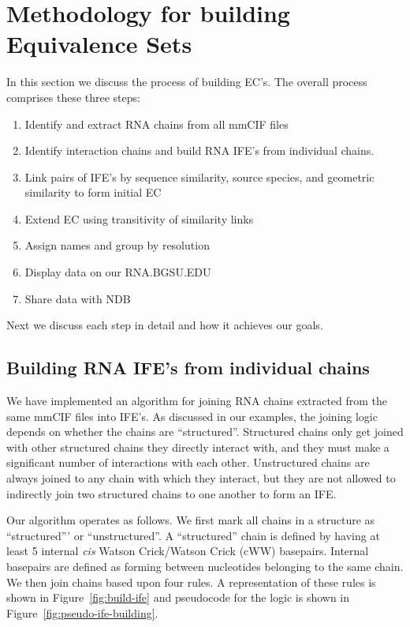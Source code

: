 \section{Methodology for building Equivalence Sets}

In this section we discuss the process of building EC's. The overall process
comprises these three steps:

\begin{enumerate}
  \item Identify and extract RNA chains from all mmCIF files

  \item Identify interaction chains and build RNA IFE's from individual chains.

  \item Link pairs of IFE's by sequence similarity, source species, and
    geometric similarity to form initial EC

  \item Extend EC using transitivity of similarity links

  \item Assign names and group by resolution

  \item Display data on our RNA.BGSU.EDU

  \item Share data with NDB
\end{enumerate}

Next we discuss each step in detail and how it achieves our goals.

\subsection{Building RNA IFE's from individual chains}

We have implemented an algorithm for joining RNA chains extracted from the same
mmCIF files into IFE's. As discussed in our examples, the joining logic depends
on whether the chains are ``structured''. Structured chains only get joined with
other structured chains they directly interact with, and they must make a
significant number of interactions with each other. Unstructured chains are
always joined to any chain with which they interact, but they are not allowed to
indirectly join two structured chains to one another to form an IFE.

Our algorithm operates as follows. We first mark all chains in a structure as
``structured''' or ``unstructured''. A ``structured'' chain is defined by having
at least 5 internal \emph{cis} Watson Crick/Watson Crick (cWW) basepairs.
Internal basepairs are defined as forming between nucleotides belonging to the
same chain. We then join chains based upon four rules. A representation of
these rules is shown in Figure~\ref{fig:build-ife} and pseudocode for the logic
is shown in Figure~\ref{fig:pseudo-ife-building}.

